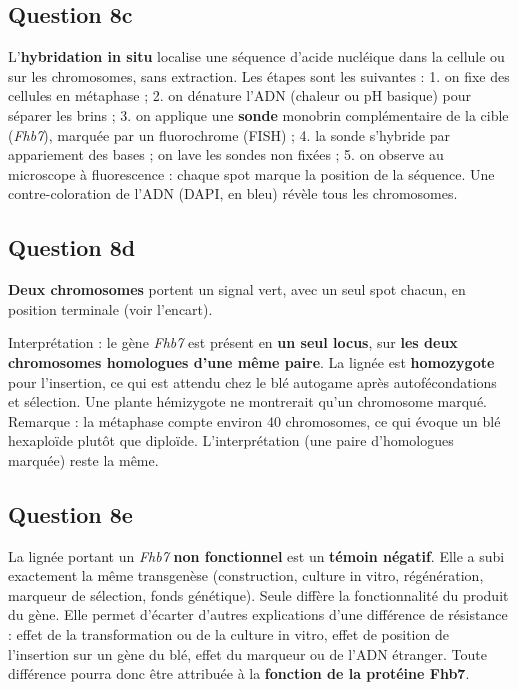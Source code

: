 \documentclass[11pt,a4paper]{article}
\begin{document}
\hypertarget{question-8c}{%
\subsection{Question 8c}\label{question-8c}}

L'\textbf{hybridation in situ} localise une séquence d'acide nucléique dans la cellule ou sur les chromosomes, sans extraction. Les étapes sont les suivantes :
1. on fixe des cellules en métaphase ;
2. on dénature l'ADN (chaleur ou pH basique) pour séparer les brins ;
3. on applique une \textbf{sonde} monobrin complémentaire de la cible (\emph{Fhb7}), marquée par un fluorochrome (FISH) ;
4. la sonde s'hybride par appariement des bases ; on lave les sondes non fixées ;
5. on observe au microscope à fluorescence : chaque spot marque la position de la séquence. Une contre-coloration de l'ADN (DAPI, en bleu) révèle tous les chromosomes.

\hypertarget{question-8d}{%
\subsection{Question 8d}\label{question-8d}}

\textbf{Deux chromosomes} portent un signal vert, avec un seul spot chacun, en position terminale (voir l'encart).

Interprétation : le gène \emph{Fhb7} est présent en \textbf{un seul locus}, sur \textbf{les deux chromosomes homologues d'une même paire}. La lignée est \textbf{homozygote} pour l'insertion, ce qui est attendu chez le blé autogame après autofécondations et sélection. Une plante hémizygote ne montrerait qu'un chromosome marqué. Remarque : la métaphase compte environ 40 chromosomes, ce qui évoque un blé hexaploïde plutôt que diploïde. L'interprétation (une paire d'homologues marquée) reste la même.

\hypertarget{question-8e}{%
\subsection{Question 8e}\label{question-8e}}

La lignée portant un \emph{Fhb7} \textbf{non fonctionnel} est un \textbf{témoin négatif}. Elle a subi exactement la même transgenèse (construction, culture in vitro, régénération, marqueur de sélection, fonds génétique). Seule diffère la fonctionnalité du produit du gène. Elle permet d'écarter d'autres explications d'une différence de résistance : effet de la transformation ou de la culture in vitro, effet de position de l'insertion sur un gène du blé, effet du marqueur ou de l'ADN étranger. Toute différence pourra donc être attribuée à la \textbf{fonction de la protéine Fhb7}.
\end{document}
